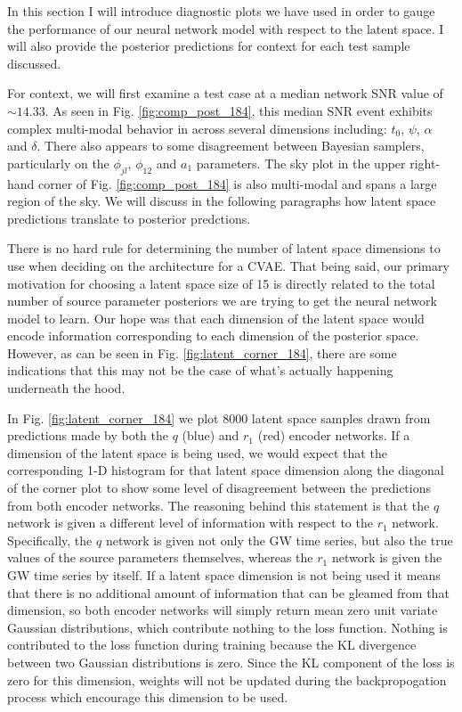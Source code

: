 %
%
In this section I will introduce diagnostic plots we have used 
in order to gauge the performance of our neural network model with 
respect to the latent space. I will also provide the posterior predictions 
for context for each test sample discussed.

%
%
For context, we will first examine a test case at a median network \ac{SNR} 
value of $\sim 14.33$. As seen in Fig. \ref{fig:comp_post_184}, this 
median \ac{SNR} event exhibits complex multi-modal behavior in across 
several dimensions including: $t_0$, $\psi$, $\alpha$ and $\delta$. 
There also appears to some disagreement between Bayesian samplers, 
particularly on the $\phi_{jl}$, $\phi_{12}$ and $a_1$ parameters. 
The sky plot in the upper right-hand corner of Fig. \ref{fig:comp_post_184} 
is also multi-modal and spans a large region of the sky. We will discuss 
in the following paragraphs how latent space predictions translate to 
posterior predctions.

%
%

There is no hard rule for determining the number of latent space 
dimensions to use when deciding on the architecture for a \ac{CVAE}. 
That being said, our primary motivation for choosing a latent space size 
of 15 is directly related to the total number of source parameter posteriors 
we are trying to get the neural network model to learn. Our hope was that 
each dimension of the latent space would encode information corresponding 
to each dimension of the posterior space. However, as can be seen 
in Fig. \ref{fig:latent_corner_184}, there are some indications that 
this may not be the case of what's actually happening underneath the 
hood. 

In Fig. \ref{fig:latent_corner_184} we plot $8000$ latent space samples 
drawn from predictions made by both the $q$ (blue) and $r_1$ (red) encoder networks. If a dimension of the latent space is being used, we would expect 
that the corresponding 1-D histogram for that latent space dimension 
along the diagonal of the corner plot to show some level of disagreement 
between the predictions from both encoder networks. The reasoning behind 
this statement is that the $q$ network is given a different level 
of information with respect to the $r_1$ network. Specifically, the 
$q$ network is given not only the \ac{GW} time series, but also 
the true values of the source parameters themselves, whereas the 
$r_1$ network is given the \ac{GW} time series by itself. If a latent space 
dimension is not being used it means that there is no additional 
amount of information that can be gleamed from that dimension, so 
both encoder networks will simply return mean zero unit variate Gaussian 
distributions, which contribute nothing to the loss function. Nothing is 
contributed to the loss function during training because the KL 
divergence between two Gaussian distributions is zero. Since the KL 
component of the loss is zero for this dimension, weights will not 
be updated during the backpropogation process which encourage this 
dimension to be used. 

